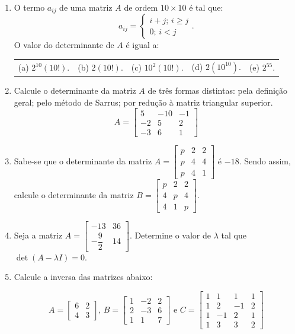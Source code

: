 \documentclass[12pt,a4paper]{article}
\begin{document}
\begin{enumerate}
  \item O termo $a_{ij}$ de uma matriz $A$ de ordem $10\times 10$ é tal que:
    $$a_{ij} = \begin{cases}i+j;\,i\geq j \\ 0;\,i<j\end{cases}.$$ O valor do
    determinante de $A$ é igual a:
    
    \begin{tabular}{lllll}
      (a) $2^{10}\left(10!\right)$. & (b) $2(10!)$. & (c) $10^2(10!)$. & (d) $2\left(10^{10}\right)$. & (e) $2^{55}$.
    \end{tabular}

  \item Calcule o determinante da matriz $A$ de três formas distintas: pela
    definição geral; pelo método de Sarrus; por redução à matriz triangular
    superior. 
    $$A=\begin{bmatrix}
      5 & -10 & -1\\
      -2 & 5 & 2\\
      -3 & 6 & 1
    \end{bmatrix}$$

  \item Sabe-se que o determinante da matriz
    $A=\begin{bmatrix}
      p & 2 & 2\\
      p & 4 & 4\\
      p & 4 & 1
    \end{bmatrix}$ é $-18$. Sendo assim, calcule
    o determinante da matriz
    $B=\begin{bmatrix}
      p & 2 & 2\\
      4 & p & 4\\
      4 & 1 & p
    \end{bmatrix}$.

  \item Seja a matriz
    $A=\begin{bmatrix} -13 & 36 \\ -\dfrac{9}{2} & 14 \end{bmatrix}$.
    Determine o valor de $\lambda$ tal que $\det(A-\lambda I) = 0$.

  \item Calcule a inversa das matrizes abaixo:

  $$A=\begin{bmatrix}
      6 & 2\\
      4 & 3
    \end{bmatrix},\,
    B=\begin{bmatrix}
      1 & -2 & 2\\
      2 & -3 & 6\\
      1 & 1 & 7
    \end{bmatrix}\textrm{ e }
    C=\begin{bmatrix}
      1 & 1 & 1 & 1\\
      1 & 2 & -1 & 2\\
      1 & -1 & 2 & 1\\
      1 & 3 & 3 & 2
    \end{bmatrix}$$


\end{enumerate}
\end{document}
